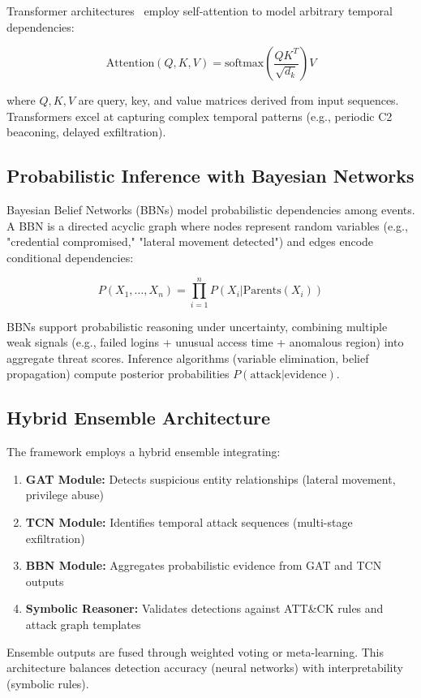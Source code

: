 Transformer architectures~\cite{vaswani2017attention} employ self-attention to model arbitrary temporal dependencies:

$$\text{Attention}(Q, K, V) = \text{softmax}\left(\frac{QK^T}{\sqrt{d_k}}\right)V$$

where $Q, K, V$ are query, key, and value matrices derived from input sequences. Transformers excel at capturing complex temporal patterns (e.g., periodic C2 beaconing, delayed exfiltration).

\subsection{Probabilistic Inference with Bayesian Networks}
Bayesian Belief Networks (BBNs) model probabilistic dependencies among events. A BBN is a directed acyclic graph where nodes represent random variables (e.g., "credential compromised," "lateral movement detected") and edges encode conditional dependencies:

$$P(X_1, \ldots, X_n) = \prod_{i=1}^{n} P(X_i | \text{Parents}(X_i))$$

BBNs support probabilistic reasoning under uncertainty, combining multiple weak signals (e.g., failed logins + unusual access time + anomalous region) into aggregate threat scores. Inference algorithms (variable elimination, belief propagation) compute posterior probabilities $P(\text{attack} | \text{evidence})$.

\subsection{Hybrid Ensemble Architecture}
The framework employs a hybrid ensemble integrating:
\begin{enumerate}
    \item \textbf{GAT Module:} Detects suspicious entity relationships (lateral movement, privilege abuse)
    \item \textbf{TCN Module:} Identifies temporal attack sequences (multi-stage exfiltration)
    \item \textbf{BBN Module:} Aggregates probabilistic evidence from GAT and TCN outputs
    \item \textbf{Symbolic Reasoner:} Validates detections against ATT\&CK rules and attack graph templates
\end{enumerate}

Ensemble outputs are fused through weighted voting or meta-learning. This architecture balances detection accuracy (neural networks) with interpretability (symbolic rules).

